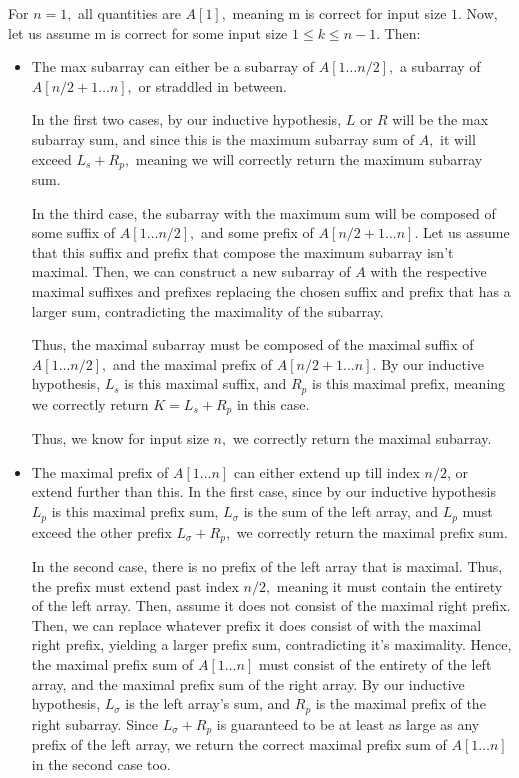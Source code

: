 \documentclass[12pt]{article}
\begin{document}
\begin{enumerate}
    For $n = 1,$ all quantities are $A[1],$ meaning m is correct for
    input size $1.$ Now, let us assume m is correct for some input
    size $1 \leq k \leq  n - 1.$ Then:
    \begin{itemize}
      \item The max subarray can either be a subarray of $A[1 \ldots
        n/2],$ a subarray of $A[n/2 + 1 \ldots n],$ or straddled in between.

        In the first two cases, by our inductive hypothesis, $L$ or
        $R$ will be the max subarray sum, and since this is the
        maximum subarray sum of $A,$ it will exceed $L_s + R_p,$
        meaning we will correctly return the maximum subarray sum.

        In the third case, the subarray with the maximum sum will be
        composed of some suffix of $A[1 \ldots n/2],$ and some prefix
        of $A[n/2 + 1 \ldots n].$ Let us assume that this suffix and
        prefix that compose the maximum subarray isn't maximal. Then,
        we can construct a new subarray of $A$ with the respective
        maximal suffixes and prefixes replacing the chosen suffix and
        prefix that has a larger sum, contradicting the maximality of
        the subarray.

        Thus, the maximal subarray must be composed of the maximal
        suffix of $A[1 \ldots n/2],$ and the maximal prefix of $A[n/2
        + 1 \ldots n].$ By our inductive hypothesis, $L_s$ is this
        maximal suffix, and $R_p$ is this maximal prefix, meaning we
        correctly return $K = L_s + R_p$ in this case.

        Thus, we know for input size $n,$ we correctly return the
        maximal subarray.

      \item The maximal prefix of $A[1 \ldots n]$ can either extend
        up till index $n/2$, or extend further than this. In the
        first case, since by our inductive hypothesis $L_p$ is this
        maximal prefix sum, $L_\sigma$ is the sum of the left array,
        and $L_p$ must exceed the other prefix $L_\sigma + R_p,$ we
        correctly return the maximal prefix sum.

        In the second case, there is no prefix of the left array that
        is maximal. Thus, the prefix must extend past index $n / 2,$
        meaning it must contain the entirety of the left array. Then,
        assume it does not consist of the maximal right prefix. Then,
        we can replace whatever prefix it does consist of with the
        maximal right prefix, yielding a larger prefix sum,
        contradicting it's maximality. Hence, the maximal prefix sum
        of $A[1 \ldots n]$ must consist of the entirety of the left
        array, and the maximal prefix sum of the right array. By our
        inductive hypothesis, $L_\sigma$ is the left array's sum, and
        $R_p$ is the maximal prefix of the right subarray. Since
        $L_\sigma + R_p$ is guaranteed to be at least as large as any
        prefix of the left array, we return the correct maximal
        prefix sum of $A[1 \ldots n]$ in the second case too.


\end{itemize}
\end{enumerate}
\end{document}
